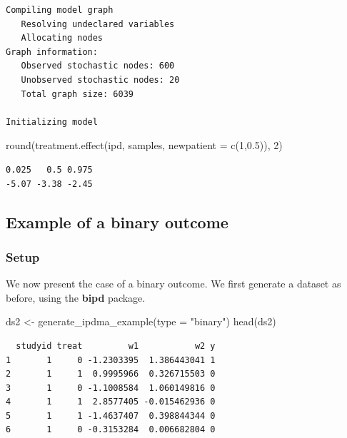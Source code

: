 \documentclass[
  letterpaper,
  DIV=11,
  numbers=noendperiod]{scrreprt}
\newenvironment{Shaded}{\begin{snugshade}}{\end{snugshade}}
\newcommand{\AttributeTok}[1]{\textcolor[rgb]{0.40,0.45,0.13}{#1}}
\newcommand{\DecValTok}[1]{\textcolor[rgb]{0.68,0.00,0.00}{#1}}
\newcommand{\FloatTok}[1]{\textcolor[rgb]{0.68,0.00,0.00}{#1}}
\newcommand{\FunctionTok}[1]{\textcolor[rgb]{0.28,0.35,0.67}{#1}}
\newcommand{\NormalTok}[1]{\textcolor[rgb]{0.00,0.23,0.31}{#1}}
\newcommand{\OtherTok}[1]{\textcolor[rgb]{0.00,0.23,0.31}{#1}}
\newcommand{\StringTok}[1]{\textcolor[rgb]{0.13,0.47,0.30}{#1}}
\begin{document}
\begin{verbatim}
Compiling model graph
   Resolving undeclared variables
   Allocating nodes
Graph information:
   Observed stochastic nodes: 600
   Unobserved stochastic nodes: 20
   Total graph size: 6039

Initializing model
\end{verbatim}

\begin{Shaded}
\begin{Highlighting}[]
\FunctionTok{round}\NormalTok{(}\FunctionTok{treatment.effect}\NormalTok{(ipd, samples, }\AttributeTok{newpatient =} \FunctionTok{c}\NormalTok{(}\DecValTok{1}\NormalTok{,}\FloatTok{0.5}\NormalTok{)), }\DecValTok{2}\NormalTok{)}
\end{Highlighting}
\end{Shaded}

\begin{verbatim}
0.025   0.5 0.975 
-5.07 -3.38 -2.45 
\end{verbatim}

\hypertarget{example-of-a-binary-outcome}{%
\subsection{Example of a binary
outcome}\label{example-of-a-binary-outcome}}

\hypertarget{setup-1}{%
\subsubsection{Setup}\label{setup-1}}

We now present the case of a binary outcome. We first generate a dataset
as before, using the \textbf{bipd} package.

\begin{Shaded}
\begin{Highlighting}[]
\NormalTok{ds2 }\OtherTok{\textless{}{-}} \FunctionTok{generate\_ipdma\_example}\NormalTok{(}\AttributeTok{type =} \StringTok{"binary"}\NormalTok{)}
\FunctionTok{head}\NormalTok{(ds2)}
\end{Highlighting}
\end{Shaded}

\begin{verbatim}
  studyid treat         w1           w2 y
1       1     0 -1.2303395  1.386443041 1
2       1     1  0.9995966  0.326715503 0
3       1     0 -1.1008584  1.060149816 0
4       1     1  2.8577405 -0.015462936 0
5       1     1 -1.4637407  0.398844344 0
6       1     0 -0.3153284  0.006682804 0
\end{verbatim}
\end{document}

